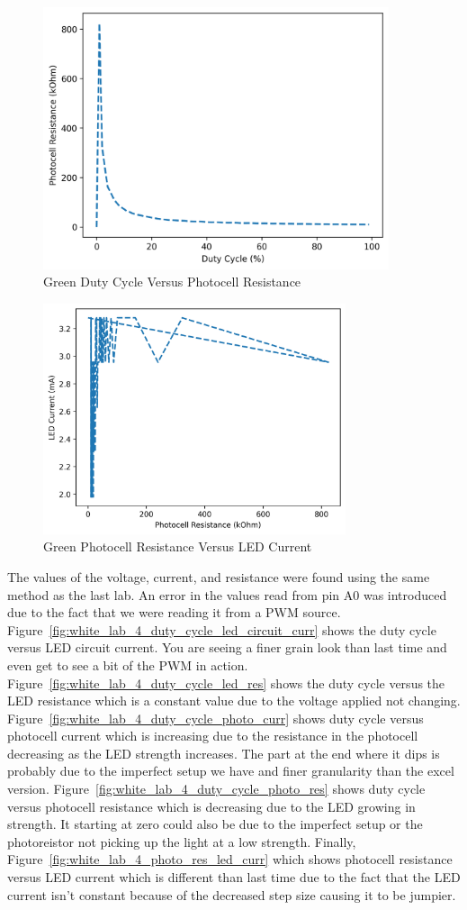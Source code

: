 \documentclass[12pt,titlepage]{article}
\begin{document}
\begin{figure}[!htb]
\centering
\includegraphics[width=4in]{lab_4/green_duty_cycle_photo_res.png}
\caption{Green Duty Cycle Versus Photocell Resistance}
\end{figure}
\begin{figure}[!htb]
  \centering
  \includegraphics[width=3.5in]{lab_4/green_photo_res_led_curr.png}
  \caption{Green Photocell Resistance Versus LED Current}
\end{figure}
The values of the voltage, current, and resistance were found using the same method as the last lab. An error in the values read from pin A0 was introduced due to
the fact that we were reading it from a PWM source. Figure~\ref{fig:white_lab_4_duty_cycle_led_circuit_curr} shows the
duty cycle versus LED circuit current. You are seeing a finer grain look than last time and even get to see a bit of the PWM in action. Figure~\ref{fig:white_lab_4_duty_cycle_led_res}
shows the duty cycle versus the LED resistance which is a constant value due to the voltage applied not changing. Figure~\ref{fig:white_lab_4_duty_cycle_photo_curr}
shows duty cycle versus photocell current which is increasing due to the resistance in the photocell decreasing as the LED strength increases. The part at the end where it dips
is probably due to the imperfect setup we have and finer granularity than the excel version. Figure~\ref{fig:white_lab_4_duty_cycle_photo_res} shows duty cycle versus photocell
resistance which is decreasing due to the LED growing in strength. It starting at zero could also be due to the imperfect setup or the photoreistor not picking up the light at a
low strength. Finally, Figure~\ref{fig:white_lab_4_photo_res_led_curr} which shows photocell resistance versus LED current which is different than last time due to the fact that
the LED current isn't constant because of the decreased step size causing it to be jumpier.
\end{document}
